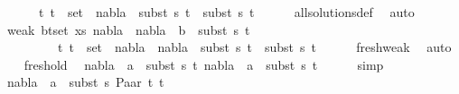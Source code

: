 \begin{isabellebody}
\ \ \ \ \ {\isachardoublequoteopen}{\isasymforall}\ {\isacharparenleft}{\kern0pt}t{}{\isacharcomma}{\kern0pt}\ t{}{\isacharparenright}{\kern0pt}\ {\isasymin}\ set\ {\isacharbrackleft}{\kern0pt}{\isacharbrackright}{\kern0pt}{\isachardot}{\kern0pt}\ nabla{}\ {\isasymturnstile}\ subst\ s{}\ t{}\ {\isasymapprox}\ subst\ s{}\ t{}{\isachardoublequoteclose}\isanewline
\ \ \ \ \isamarkupfalse%
\ all{\isacharunderscore}{\kern0pt}solutions{\isacharunderscore}{\kern0pt}def\ \isamarkupfalse%
\ auto\isanewline
\ \ \isamarkupfalse%
\ weak{}{\isacharcolon}{\kern0pt}\ {\isachardoublequoteopen}{\isasymforall}{\isacharparenleft}{\kern0pt}b{\isacharcomma}{\kern0pt}t{\isacharparenright}{\kern0pt}{\isasymin}set\ xs{\isachardot}{\kern0pt}\ {\isacharparenleft}{\kern0pt}nabla{}\ {\isasymunion}\ nabla{}{\isacharparenright}{\kern0pt}\ {\isasymturnstile}\ b\ {\isasymsharp}\ subst\ s{}\ t{\isachardoublequoteclose}\isanewline
\ \ \ \ \ \ \ \ {\isachardoublequoteopen}{\isasymforall}\ {\isacharparenleft}{\kern0pt}t{}{\isacharcomma}{\kern0pt}\ t{}{\isacharparenright}{\kern0pt}\ {\isasymin}\ set\ {\isacharbrackleft}{\kern0pt}{\isacharbrackright}{\kern0pt}{\isachardot}{\kern0pt}\ {\isacharparenleft}{\kern0pt}nabla{}\ {\isasymunion}\ nabla{}{\isacharparenright}{\kern0pt}\ {\isasymturnstile}\ subst\ s{}\ t{}\ {\isasymapprox}\ subst\ s{}\ t{}{\isachardoublequoteclose}\isanewline
\ \ \ \ \isamarkupfalse%
\ fresh{\isacharunderscore}{\kern0pt}weak\ \isamarkupfalse%
\ auto\isanewline
\ \ \isamarkupfalse%
\ fresh{\isacharunderscore}{\kern0pt}old\ \isamarkupfalse%
\ {\isachardoublequoteopen}nabla{}\ {\isasymturnstile}\ a\ {\isasymsharp}\ subst\ s{}\ t{}{\isachardoublequoteclose}\ {\isachardoublequoteopen}nabla{}\ {\isasymturnstile}\ a\ {\isasymsharp}\ subst\ s{}\ t{}{\isachardoublequoteclose}\isanewline
\ \ \ \ \isamarkupfalse%
\ simp{\isacharplus}{\kern0pt}\isanewline
\ \ \isamarkupfalse%
\ {\isachardoublequoteopen}nabla{}\ {\isasymturnstile}\ a\ {\isasymsharp}\ subst\ s{}\ {\isacharparenleft}{\kern0pt}Paar\ t{}\ t{}{\isacharparenright}{\kern0pt}{\isachardoublequoteclose}\isanewline

\end{isabellebody}
